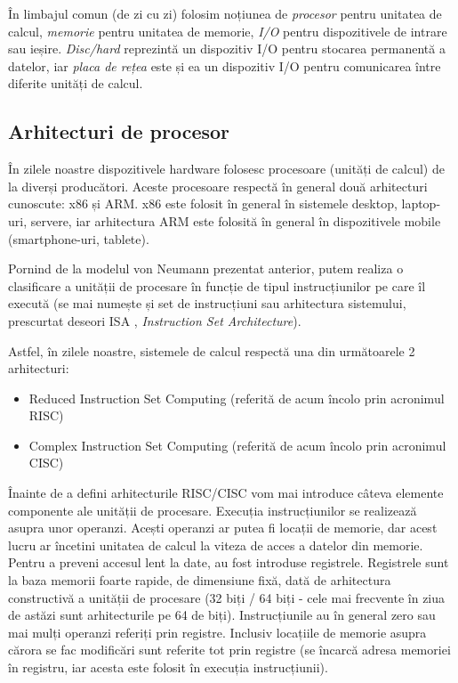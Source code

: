 În limbajul comun (de zi cu zi) folosim noțiunea de \textit{procesor} pentru
unitatea de calcul, \textit{memorie} pentru unitatea de memorie, \textit{I/O}
pentru dispozitivele de intrare sau ieșire. \textit{Disc/hard} reprezintă un
dispozitiv I/O pentru stocarea permanentă a datelor, iar \textit{placa de rețea}
este și ea un dispozitiv I/O pentru comunicarea între diferite unități de
calcul.

\subsection{Arhitecturi de procesor}
\label{sec:hw:class:cpu}

În zilele noastre dispozitivele hardware folosesc procesoare (unități de calcul)
de la diverși producători. Aceste procesoare respectă în general două
arhitecturi cunoscute: x86 și ARM. x86 este folosit în general în sistemele
desktop, laptop-uri, servere, iar arhitectura ARM este folosită în general în
dispozitivele mobile (smartphone-uri, tablete).

Pornind de la modelul von Neumann prezentat anterior, putem realiza o
clasificare a unității de procesare în funcție de tipul instrucțiunilor pe care
îl execută (se mai numește și set de instrucțiuni sau arhitectura sistemului,
prescurtat deseori ISA , \textit{Instruction
Set Architecture}).

Astfel, în zilele noastre, sistemele de calcul respectă una din următoarele 2
arhitecturi:

\begin{itemize}
	\item Reduced Instruction Set Computing (referită de acum încolo prin
          acronimul RISC) 
	\item Complex Instruction Set Computing (referită de acum încolo prin
          acronimul CISC) 
\end{itemize}

Înainte de a defini arhitecturile RISC/CISC vom mai introduce câteva elemente
componente ale unității de procesare. Execuția instrucțiunilor se realizează
asupra unor operanzi. Acești operanzi ar putea fi locații de memorie, dar acest
lucru ar încetini unitatea de calcul la viteza de acces a datelor din memorie.
Pentru a preveni accesul lent la date, au fost introduse registrele. Registrele
sunt la baza memorii foarte rapide, de dimensiune fixă, dată de arhitectura
constructivă a unității de procesare (32 biți / 64 biți - cele mai frecvente în ziua
de astăzi sunt arhitecturile pe 64 de biți). Instrucțiunile au în general zero
sau mai mulți operanzi referiți prin registre. Inclusiv locațiile de memorie
asupra cărora se fac modificări sunt referite tot prin registre (se încarcă
adresa memoriei în registru, iar acesta este folosit în execuția instrucțiunii).

